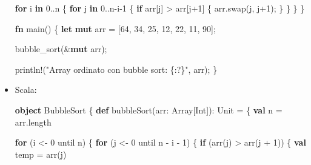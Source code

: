 \documentclass[
  letterpaper,
]{scrbook}
\newenvironment{Shaded}{\begin{snugshade}}{\end{snugshade}}
\newcommand{\BuiltInTok}[1]{\textcolor[rgb]{0.00,0.23,0.31}{#1}}
\newcommand{\ControlFlowTok}[1]{\textcolor[rgb]{0.00,0.23,0.31}{\textbf{#1}}}
\newcommand{\DecValTok}[1]{\textcolor[rgb]{0.68,0.00,0.00}{#1}}
\newcommand{\ExtensionTok}[1]{\textcolor[rgb]{0.00,0.23,0.31}{#1}}
\newcommand{\FunctionTok}[1]{\textcolor[rgb]{0.28,0.35,0.67}{#1}}
\newcommand{\KeywordTok}[1]{\textcolor[rgb]{0.00,0.23,0.31}{\textbf{#1}}}
\newcommand{\NormalTok}[1]{\textcolor[rgb]{0.00,0.23,0.31}{#1}}
\newcommand{\OperatorTok}[1]{\textcolor[rgb]{0.37,0.37,0.37}{#1}}
\newcommand{\PreprocessorTok}[1]{\textcolor[rgb]{0.68,0.00,0.00}{#1}}
\newcommand{\StringTok}[1]{\textcolor[rgb]{0.13,0.47,0.30}{#1}}
\begin{document}
\begin{itemize}
\begin{Shaded}
\begin{Highlighting}[]
  \ControlFlowTok{for}\NormalTok{ i }\KeywordTok{in} \DecValTok{0}\OperatorTok{..}\NormalTok{n }\OperatorTok{\{}
    \ControlFlowTok{for}\NormalTok{ j }\KeywordTok{in} \DecValTok{0}\OperatorTok{..}\NormalTok{n}\OperatorTok{{-}}\NormalTok{i}\OperatorTok{{-}}\DecValTok{1} \OperatorTok{\{}
      \ControlFlowTok{if}\NormalTok{ arr[j] }\OperatorTok{\textgreater{}}\NormalTok{ arr[j}\OperatorTok{+}\DecValTok{1}\NormalTok{] }\OperatorTok{\{}
\NormalTok{        arr}\OperatorTok{.}\NormalTok{swap(j}\OperatorTok{,}\NormalTok{ j}\OperatorTok{+}\DecValTok{1}\NormalTok{)}\OperatorTok{;}
      \OperatorTok{\}}
    \OperatorTok{\}}
  \OperatorTok{\}}
\OperatorTok{\}}

\KeywordTok{fn}\NormalTok{ main() }\OperatorTok{\{}
  \KeywordTok{let} \KeywordTok{mut}\NormalTok{ arr }\OperatorTok{=}\NormalTok{ [}\DecValTok{64}\OperatorTok{,} \DecValTok{34}\OperatorTok{,} \DecValTok{25}\OperatorTok{,} \DecValTok{12}\OperatorTok{,} \DecValTok{22}\OperatorTok{,} \DecValTok{11}\OperatorTok{,} \DecValTok{90}\NormalTok{]}\OperatorTok{;}

\NormalTok{  bubble\_sort(}\OperatorTok{\&}\KeywordTok{mut}\NormalTok{ arr)}\OperatorTok{;}

  \PreprocessorTok{println!}\NormalTok{(}\StringTok{"Array ordinato con bubble sort: \{:?\}"}\OperatorTok{,}\NormalTok{ arr)}\OperatorTok{;}
\OperatorTok{\}}
\end{Highlighting}
\end{Shaded}
\item
  Scala:

\begin{Shaded}
\begin{Highlighting}[]
\KeywordTok{object}\NormalTok{ BubbleSort }\OperatorTok{\{}
  \KeywordTok{def} \FunctionTok{bubbleSort}\OperatorTok{(}\NormalTok{arr}\OperatorTok{:} \ExtensionTok{Array}\OperatorTok{[}\BuiltInTok{Int}\OperatorTok{]):} \BuiltInTok{Unit} \OperatorTok{=} \OperatorTok{\{}
    \KeywordTok{val}\NormalTok{ n }\OperatorTok{=}\NormalTok{ arr}\OperatorTok{.}\NormalTok{length}

    \ControlFlowTok{for} \OperatorTok{(}\NormalTok{i }\OperatorTok{\textless{}{-}} \DecValTok{0}\NormalTok{ until n}\OperatorTok{)} \OperatorTok{\{}
      \ControlFlowTok{for} \OperatorTok{(}\NormalTok{j }\OperatorTok{\textless{}{-}} \DecValTok{0}\NormalTok{ until n }\OperatorTok{{-}}\NormalTok{ i }\OperatorTok{{-}} \DecValTok{1}\OperatorTok{)} \OperatorTok{\{}
        \ControlFlowTok{if} \OperatorTok{(}\FunctionTok{arr}\OperatorTok{(}\NormalTok{j}\OperatorTok{)} \OperatorTok{\textgreater{}} \FunctionTok{arr}\OperatorTok{(}\NormalTok{j }\OperatorTok{+} \DecValTok{1}\OperatorTok{))} \OperatorTok{\{}
          \KeywordTok{val}\NormalTok{ temp }\OperatorTok{=} \FunctionTok{arr}\OperatorTok{(}\NormalTok{j}\OperatorTok{)}


\end{Highlighting}
\end{Shaded}
\end{itemize}
\end{document}
